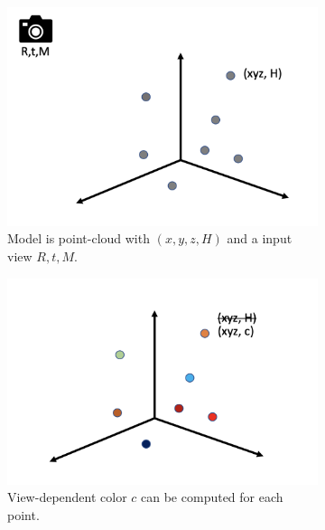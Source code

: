 \documentclass[10pt,twocolumn,letterpaper]{article}
\begin{document}
\begin{figure}
    \centering
    \begin{subfigure}[b]{0.32\textwidth}
        \includegraphics[width=\textwidth]{figures/model_1.png}
        \caption{Model is point-cloud with $(x, y, z, H)$ and a input view $R, t, M$. }
        \label{fig:model_1}
    \end{subfigure}
    \hfill
    \begin{subfigure}[b]{0.32\textwidth}  
        \includegraphics[width=\textwidth]{figures/model_2.png}
        \caption{View-dependent color $c$ can be computed for each point. }
        \label{fig:model_2}
    \end{subfigure}
    \hfill
    \begin{subfigure}[b]{0.32\textwidth}  

\end{subfigure}
\end{figure}
\end{document}
